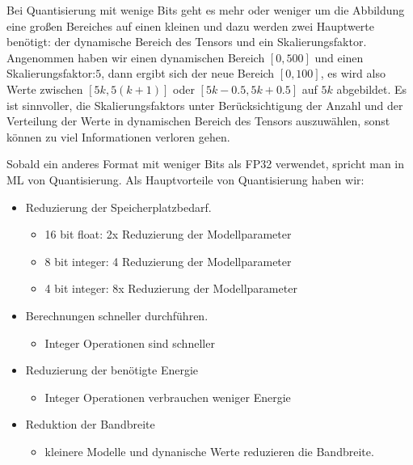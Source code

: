 \documentclass[12pt,a4paper]{scrartcl}
\numberwithin{equation}{section}
\begin{document}
Bei Quantisierung mit wenige Bits geht es mehr oder weniger um die Abbildung eine großen Bereiches auf einen kleinen und dazu werden zwei Hauptwerte benötigt: der dynamische Bereich des Tensors und ein Skalierungsfaktor. Angenommen haben wir einen dynamischen Bereich $ [0,500] $ und einen Skalierungsfaktor:$ 5 $, dann ergibt sich der neue Bereich $ [0, 100] $, es wird also Werte zwischen $ [5k, 5(k+1)] $ oder $ [5k -0.5, 5k +0.5] $ auf $ 5k $ abgebildet. Es ist sinnvoller,  die Skalierungsfaktors unter Berücksichtigung der Anzahl und der Verteilung der Werte in dynamischen Bereich des Tensors auszuwählen, sonst können zu viel Informationen verloren gehen.

Sobald ein anderes Format mit weniger Bits als FP32 verwendet, spricht man in \ac{ML} von Quantisierung.
Als Hauptvorteile von Quantisierung haben wir:
\begin{itemize}
	\item  Reduzierung der Speicherplatzbedarf.\\
		\begin{itemize}
			\item 16 bit float: 2x Reduzierung der Modellparameter\\
			\item 8 bit integer: 4 Reduzierung der Modellparameter\\
			\item 4 bit integer: 8x Reduzierung der Modellparameter
		\end{itemize}	
		
	\item  Berechnungen schneller  durchführen.
		\begin{itemize}
			\item Integer Operationen sind schneller
		\end{itemize}
	\item Reduzierung der benötigte Energie
		\begin{itemize}
			\item Integer Operationen verbrauchen weniger Energie
		\end{itemize}
	\item Reduktion der Bandbreite
		\begin{itemize}
			\item kleinere Modelle und dynanische Werte reduzieren die Bandbreite. 
		\end{itemize}
\end{itemize}
\end{document}
